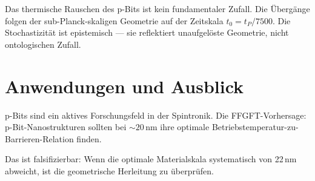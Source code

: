 \begin{ffgftbox}
Das thermische Rauschen des p-Bits ist kein fundamentaler Zufall.
Die Übergänge folgen der sub-Planck-skaligen Geometrie auf der Zeitskala
$t_0 = t_P/7500$. Die Stochastizität ist epistemisch --- sie reflektiert
unaufgelöste Geometrie, nicht ontologischen Zufall. 
\end{ffgftbox}

\section{Anwendungen und Ausblick}

p-Bits sind ein aktives Forschungsfeld in der Spintronik.
Die FFGFT-Vorhersage: p-Bit-Nanostrukturen sollten bei ${\sim}20\,\text{nm}$
ihre optimale Betriebstemperatur-zu-Barrieren-Relation finden. 

Das ist falsifizierbar: Wenn die optimale Materialskala systematisch von
22\,nm abweicht, ist die geometrische Herleitung zu überprüfen.
